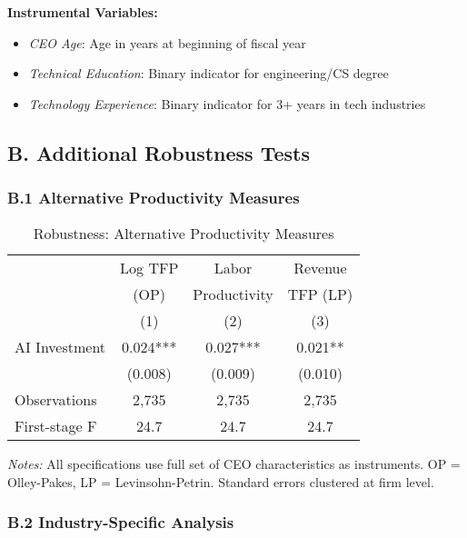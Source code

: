 \documentclass[12pt, a4paper]{article}
\begin{document}
\textbf{Instrumental Variables:}
\begin{itemize}
\item \textit{CEO Age}: Age in years at beginning of fiscal year
\item \textit{Technical Education}: Binary indicator for engineering/CS degree
\item \textit{Technology Experience}: Binary indicator for 3+ years in tech industries
\end{itemize}

\subsection*{B. Additional Robustness Tests}

\subsubsection*{B.1 Alternative Productivity Measures}

\begin{table}[H]
\centering
\caption{Robustness: Alternative Productivity Measures}
\label{tab:robustness_productivity}
\begin{tabular}{lccc}
\toprule
 & Log TFP & Labor & Revenue \\
 & (OP) & Productivity & TFP (LP) \\
 & (1) & (2) & (3) \\
\midrule
AI Investment & 0.024*** & 0.027*** & 0.021** \\
 & (0.008) & (0.009) & (0.010) \\
\midrule
Observations & 2,735 & 2,735 & 2,735 \\
First-stage F & 24.7 & 24.7 & 24.7 \\
\bottomrule
\end{tabular}
\begin{minipage}{\textwidth}
\footnotesize
\textit{Notes:} All specifications use full set of CEO characteristics as instruments. OP = Olley-Pakes, LP = Levinsohn-Petrin. Standard errors clustered at firm level.
\end{minipage}
\end{table}

\subsubsection*{B.2 Industry-Specific Analysis}
\end{document}
